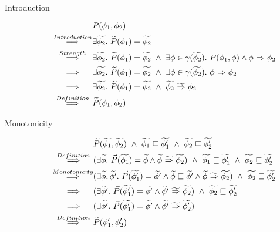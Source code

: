 \begin{proofatend}~
    \begin{description}
        \item[Introduction] 
        \begin{align*}
        &P(\phi_1, \phi_2) \\
        \overset{Introduction}{~\quad\implies\quad~} 
        &\exists \widetilde{\phi_2}.~ \widetilde{P}(\phi_1) = \widetilde{\phi_2}\\
        \overset{Strength}{~\quad\implies\quad~} 
        &\exists \widetilde{\phi_2}.~ \widetilde{P}(\phi_1) = \widetilde{\phi_2} ~\wedge~ \exists \phi \in \gamma(\widetilde{\phi_2}).~ P(\phi_1, \phi) \wedge {\phi} \,\,{\Rightarrow}\,\, {\phi_2} \\
        \overset{}{~\quad\implies\quad~} 
        &\exists \widetilde{\phi_2}.~ \widetilde{P}(\phi_1) = \widetilde{\phi_2} ~\wedge~ \exists \phi \in \gamma(\widetilde{\phi_2}).~ {\phi} \,\,{\Rightarrow}\,\, {\phi_2} \\
        \overset{}{~\quad\implies\quad~} 
        &\exists \widetilde{\phi_2}.~ \widetilde{P}(\phi_1) = \widetilde{\phi_2} ~\wedge~  {\widetilde{\phi_2}} \,\,{\widetilde{\Rightarrow}}\,\, {\phi_2} \\
        \overset{Definition}{~\quad\implies\quad~} 
        &\widetilde{P}(\phi_1, \phi_2)
        \end{align*}
        
        \item[Monotonicity] 
        \begin{align*}
        &\widetilde{P}(\widetilde{\phi_1}, \widetilde{\phi_2}) ~\wedge~ \widetilde{\phi_1} \sqsubseteq \widetilde{\phi_1'} ~\wedge~ \widetilde{\phi_2} \sqsubseteq \widetilde{\phi_2'}\\
        \overset{Definition}{~\quad\implies\quad~}
        &(\exists \widetilde{\phi}.~ \vec{P}(\widetilde{\phi_1}) = \widetilde{\phi} \wedge {\widetilde{\phi}} \,\,{\widetilde{\Rightarrow}}\,\, {\widetilde{\phi_2}}) ~\wedge~ \widetilde{\phi_1} \sqsubseteq \widetilde{\phi_1'} ~\wedge~ \widetilde{\phi_2} \sqsubseteq \widetilde{\phi_2'}\\
        \overset{Monotonicity}{~\quad\implies\quad~}
        &(\exists \widetilde{\phi}, \widetilde{\phi'}.~ \vec{P}(\widetilde{\phi_1'}) = \widetilde{\phi'} \wedge \widetilde{\phi} \sqsubseteq \widetilde{\phi'} \wedge {\widetilde{\phi}} \,\,{\widetilde{\Rightarrow}}\,\, {\widetilde{\phi_2}}) ~\wedge~ \widetilde{\phi_2} \sqsubseteq \widetilde{\phi_2'}\\
        \overset{}{~\quad\implies\quad~} 
        &(\exists \widetilde{\phi'}.~ \vec{P}(\widetilde{\phi_1'}) = \widetilde{\phi'} \wedge {\widetilde{\phi'}} \,\,{\widetilde{\Rightarrow}}\,\, {\widetilde{\phi_2}}) ~\wedge~ \widetilde{\phi_2} \sqsubseteq \widetilde{\phi_2'}\\
        \overset{}{~\quad\implies\quad~} 
        &(\exists \widetilde{\phi'}.~ \vec{P}(\widetilde{\phi_1'}) = \widetilde{\phi'} \wedge {\widetilde{\phi'}} \,\,{\widetilde{\Rightarrow}}\,\, {\widetilde{\phi_2'}})\\
        \overset{Definition}{~\quad\implies\quad~} 
        &\widetilde{P}(\phi_1', \phi_2')
        \end{align*}
    \end{description}
\end{proofatend}

